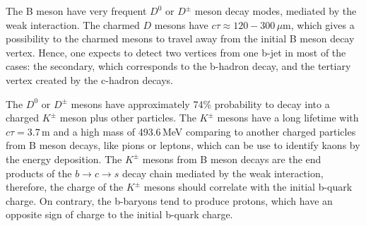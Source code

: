 The B meson have very frequent $D^0$ or $D^\pm$ meson decay modes, mediated by the weak interaction. The charmed $D$ mesons have $c\tau \approx 120 - 300$\,$\mu$m, which gives a possibility to the charmed mesons to travel away from the initial B meson decay vertex. 
Hence, one expects to detect two vertices from one b-jet in most of the cases: the secondary, which corresponds to the b-hadron decay, and the tertiary vertex created by the c-hadron decays. 

The $D^0$ or $D^\pm$ mesons have approximately 74\% probability to decay into a charged $K^\pm$ meson plus other particles. The $K^\pm$ mesons have a long lifetime with $c\tau = 3.7$\,m and a high mass of 493.6\,MeV comparing to another charged particles from B meson decays, like pions or leptons, which can be use to identify kaons by the energy deposition. The $K^\pm$ mesons from B meson decays are the end products of the $b\to c\to s$ decay chain mediated by the weak interaction, therefore, the charge of the $K^\pm$ mesons should correlate with the initial b-quark charge. 
On contrary, the b-baryons tend to produce protons, which have an opposite sign of charge to the initial b-quark charge. 

